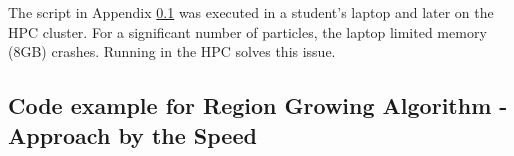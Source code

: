 \documentclass[12pt]{article}
\begin{document}
The script in Appendix \ref{App:App_speed_code} was executed in a student's
laptop and later on the HPC cluster. For a significant number of particles, the laptop limited memory (8GB) crashes. Running in the HPC solves this issue.


\subsection{Code example for Region Growing Algorithm - Approach by the Speed} \label{App:App_speed_code}
\tiny

\end{document}
